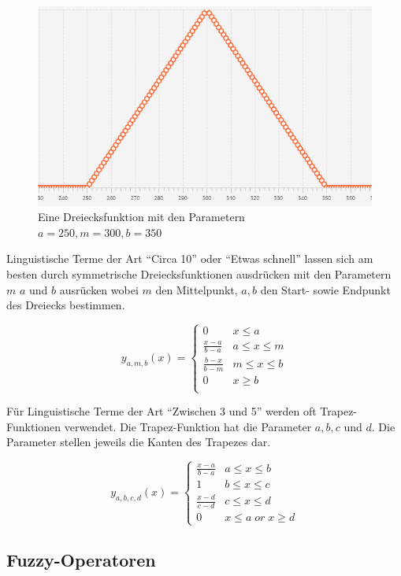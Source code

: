 \documentclass[12pt,a4paper,bibliography=totocnumbered,listof=totocnumbered]{scrartcl}
\theoremstyle{Umgebung}
\begin{document}
\begin{figure}
	\centering
	\includegraphics[width=0.5\linewidth]{img/triangle}
	\caption{Eine Dreiecksfunktion mit den Parametern $a=250, m = 300,  b = 350$}
	\label{fig:triangle}
\end{figure}



Linguistische Terme der Art \enquote{Circa 10} oder \enquote{Etwas schnell} lassen sich am besten durch symmetrische Dreiecksfunktionen ausdrücken mit den Parametern $m$ $a$ und $b$ ausrücken wobei $m$ den Mittelpunkt, $a, b$ den Start- sowie Endpunkt des Dreiecks bestimmen.

\begin{equation}
y_{a,m,b}(x)=\begin{cases}
0				& x \leq a \\
\frac{x-a}{b-a} & a \leq x \leq m  \\
\frac{b-x}{b-m} & m \leq x \leq b  \\
0 				& x \geq b \\
\end{cases}
\end{equation}

Für Linguistische Terme der Art \enquote{Zwischen 3 und 5} werden oft Trapez-Funktionen verwendet. Die Trapez-Funktion hat die Parameter $a,b,c$ und $d$. Die Parameter stellen jeweils die Kanten des Trapezes dar.

\begin{equation}
y_{a,b,c,d}(x)=\begin{cases}
\frac{x-a}{b-a} & a \leq x \leq b  \\
1 				& b \leq x \leq c \\
\frac{x-d}{c-d} & c \leq x \leq d \\
0				& x \le a \; or \; x \ge d  
\end{cases}
\end{equation}

\label{fuzzy-operatoren}
\subsection{Fuzzy-Operatoren}
\end{document}
